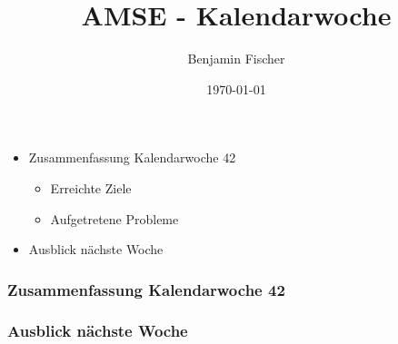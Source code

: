 \documentclass{beamer}
\title{AMSE - Kalendarwoche \cw{}}
\date{\today}
\author{Benjamin Fischer}
\institute{benjamin.f.fischer@fau.de}
\newcommand{\cw}{42}
\begin{document}
  \maketitle

  \begin{frame}
    \begin{itemize}
      \item Zusammenfassung Kalendarwoche \cw{}
      \begin{itemize}
        \item Erreichte Ziele
        \item Aufgetretene Probleme
      \end{itemize}
      \item Ausblick nächste Woche
    \end{itemize}
  \end{frame}

  \begin{frame}
    \frametitle{Zusammenfassung Kalendarwoche \cw{}}

  \end{frame}

  \begin{frame}
    \frametitle{Ausblick nächste Woche}
    
  \end{frame}
\end{document}
